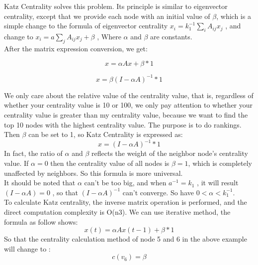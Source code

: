 \documentclass{article}
\begin{document}
Katz Centrality solves this problem. Its principle is similar to eigenvector centrality, except that we provide each node with an initial value of $\beta$, which is a simple change to the formula of eigenvector centrality $x_i=k_1^{-1} \sum\limits_{i}A_{ij}x_j$ , and change to $x_i=a\sum\limits_jA_{ij}x_j+\beta$ , Where $\alpha$ and $\beta$ are constants. \\

After the matrix expression conversion, we get:

\begin{equation}
x = \alpha A x + \beta * 1
\end{equation}

\begin{equation}
x = \beta (I - \alpha A)^{-1} * 1
\end{equation}

We only care about the relative value of the centrality value, that is, regardless of whether your centrality value is 10 or 100, we only pay attention to whether your centrality value is greater than my centrality value, because we want to find the top 10 nodes with the highest centrality value. The purpose is to do rankings. Then $\beta$ can be set to 1, so Katz Centrality is expressed as: \\
\begin{equation}
x = (I - \alpha A)^{-1} * 1
\end{equation}
In fact, the ratio of $\alpha$ and $\beta$ reflects the weight of the neighbor node's centrality value. If $\alpha = 0$ then the centrality value of all nodes is $\beta = 1$, which is completely unaffected by neighbors. So this formula is more universal. \\
It should be noted that $\alpha$ can't be too big, and when $a^{-1} = k_1$  , it will result $(I - \alpha A) = 0$  , so that $(I - \alpha A)^{-1}$ can't converge. So have $0< \alpha < k_1^{-1}$. \\
To calculate Katz centrality, the inverse matrix operation is performed, and the direct computation complexity is O(n3). We can use iterative method, the formula as follow shows:\\
\begin{equation}
x(t) = \alpha A x (t - 1) + \beta * 1
\end{equation}
So that the centrality calculation method of node 5 and 6 in the above example will change to : \\

\begin{equation}
c(v_6) = \beta
\end{equation}
\end{document}
